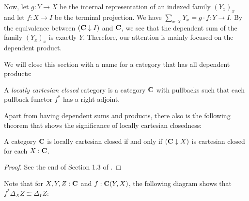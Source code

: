 Now, let $ g : Y \to X $ be the internal representation of an indexed family $ (Y_x)_x $ and let $ f : X \to I $ be the terminal projection. We have $ \sum_{x : X} Y_x = g \cdot f : Y \to I $. By the equivalence between $ (\mathbf{C} \downarrow I) $ and $ \mathbf{C} $, we see that the dependent sum of the family $ (Y_x)_x $ is exactly $ Y $. Therefore, our attention is mainly focused on the dependent product.

We will close this section with a name for a category that has all dependent products:

\begin{definition}
  A \textit{locally cartesian closed} category is a category $ \mathbf{C} $ with pullbacks such that each pullback functor $ f^* $ has a right adjoint.
\end{definition}

Apart from having dependent sums and products, there also is the following theorem that shows the significance of locally cartesian closedness:
\begin{lemma}\label{lem:locally-cartesian-closed}
  A category $ \mathbf{C} $ is locally cartesian closed if and only if $ (\mathbf{C} \downarrow X) $ is cartesian closed for each $ X : \mathbf{C} $.
\end{lemma}
\begin{proof}
  See the end of Section 1.3 of \autocite{freyd}.
\end{proof}

\begin{remark}\label{rem:pullback-of-projection}
  Note that for $ X, Y, Z : \mathbf{C} $ and $ f: \mathbf{C}(Y, X) $, the following diagram shows that $ f^* \Delta_X Z \cong \Delta_Y Z $:
  \begin{center}
  \end{center}
\end{remark}


